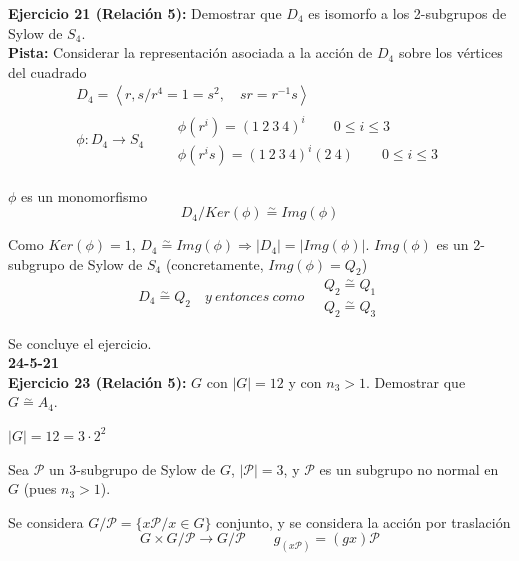 \documentclass{article}
\begin{document}
\textbf{Ejercicio 21 (Relación 5):} Demostrar que $D_4$ es isomorfo a los 2-subgrupos de Sylow de $S_4$. \\
\textbf{Pista:} Considerar la representación asociada a la acción de $D_4$ sobre los vértices del cuadrado
\begin{gather*}
D_4=\left\langle r,s/r^4=1=s^2,\quad sr=r^{-1}s\right\rangle \\
\phi:D_4\longrightarrow S_4 \qquad \left.\begin{array}{c}
\phi(r^i)=(1\:2\:3\:4)^i\qquad 0\leq i\leq 3 \\
\phi(r^is)=(1\:2\:3\:4)^i(2\:4)\qquad 0\leq i\leq 3
\end{array} \right.
\end{gather*}

$\phi$ es un monomorfismo
\begin{equation*}
D_4/Ker(\phi)\overset{\sim}{=} Img(\phi)
\end{equation*}

Como $Ker(\phi)=1$, $D_4\overset{\sim}{=} Img(\phi)\Rightarrow |D_4|=|Img(\phi)|$. $Img(\phi)$ es un 2-subgrupo de Sylow de $S_4$ (concretamente, $Img(\phi)=Q_2$) 
\begin{equation*}
D_4\overset{\sim}{=} Q_2\quad y\:entonces\:como \quad \left.\begin{array}{c}
Q_2\overset{\sim}{=} Q_1\\
Q_2\overset{\sim}{=} Q_3
\end{array} \right.
\end{equation*}

Se concluye el ejercicio. \\

\textbf{24-5-21} \\

\textbf{Ejercicio 23 (Relación 5):} $G$ con $|G|=12$ y con $n_3>1$. Demostrar que $G\overset{\sim}{=}A_4$.

$|G|=12=3\cdot 2^2$

Sea $\mathcal{P}$ un 3-subgrupo de Sylow de $G$, $|\mathcal{P}|=3$, y $\mathcal{P}$ es un subgrupo no normal en $G$ (pues $n_3>1$).

Se considera $G/\mathcal{P}=\{x\mathcal{P}/x\in G\}$ conjunto, y se considera la acción por traslación
\begin{equation*}
G\times G/\mathcal{P}\longrightarrow G/\mathcal{P} \qquad g_{(x\mathcal{P})}=(gx)\mathcal{P}
\end{equation*}
\end{document}
